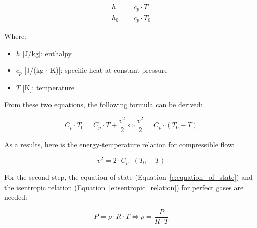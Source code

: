 \documentclass[../main]{subfiles}
\begin{document}
\vspace{0mm}
\begin{equation}
\begin{aligned}
    h &= c_p \cdot T \\
    h_0 &= c_p \cdot T_0
\end{aligned}
\label{e:enthalpy_temperature}
\end{equation}
\vspace{0mm}

\vspace{0mm}
\begin{minipage}{\linewidth}
Where:
\begin{itemize}
    \item[] $h$ [J/kg]: enthalpy
    \item[] $c_{p}$ [J/(kg $\cdot$ K)]: specific heat at constant pressure
    \item[] $T$ [K]: temperature
\end{itemize}
\end{minipage}
\vspace{2mm}

From these two equations, the following formula can be derived:

\vspace{0mm}
\begin{equation*}
C_p \cdot T_0 = C_p \cdot T + \frac{v^{2}}{2}
\Leftrightarrow
\frac{v^2}{2} = C_p \cdot (T_0 - T)
\end{equation*}
\vspace{0mm}

As a results, here is the energy-temperature relation for compressible flow:

\vspace{0mm}
\begin{equation}
v^2 = 2 \cdot C_p \cdot (T_0 - T)
\label{e:energy_temperature_relation}
\end{equation}
\vspace{0mm}

For the second step, the equation of state (Equation~\ref{e:equation_of_state}) and the isentropic relation (Equation~\ref{e:isentropic_relation}) for perfect gases are needed:

\vspace{0mm}
\begin{equation}
P = \rho \cdot R \cdot T
\Leftrightarrow
\rho = \frac{P}{R \cdot T}
\label{e:equation_of_state}
\end{equation}
\vspace{0mm}
\end{document}
